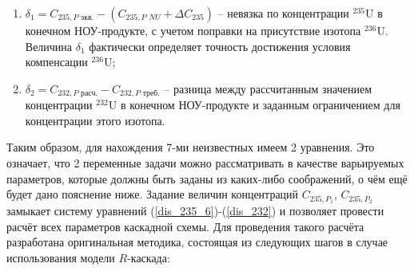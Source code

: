 {\begin{enumerate}
    \item $\delta_{1}=C_{235,P\textit{ экв.}}-(C_{235,P\textit{ NU}}+\Delta C_{235})$ -- невязка по концентрации $^{235}$U в конечном НОУ-продукте, с учетом поправки на присутствие изотопа $^{236}$U. Величина $\delta_{1}$ фактически определяет точность достижения условия компенсации $^{236}$U;
    \item $\delta_{2}=C_{232,P\textit{ расч.}}-C_{232,P\textit{ треб.}}$ -- разница между рассчитанным значением концентрации $^{232}$U в конечном НОУ-продукте и заданным ограничением для концентрации этого изотопа.
\end{enumerate}

Таким образом, для нахождения 7-ми неизвестных имеем 2 уравнения. Это означает, что 2 переменные задачи можно рассматривать в качестве варьируемых параметров, которые должны быть заданы из каких-либо соображений, о чём ещё будет дано пояснение ниже. Задание величин концентраций $C_{235,{P_1}}$, $C_{235,{P_2}}$ замыкает систему уравнений (\ref{dis_235_6})-(\ref{dis_232}) и позволяет провести расчёт всех параметров каскадной схемы. Для проведения такого расчёта разработана оригинальная методика, состоящая из следующих шагов в случае использования модели $R$-каскада:

}
